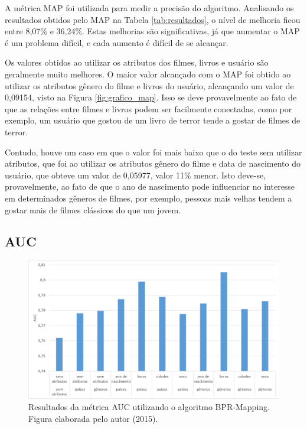 A métrica \ac{MAP} foi utilizada para medir a precisão do algoritmo. Analisando os resultados obtidos pelo \ac{MAP} na Tabela \ref{tab:resultados}, o nível de melhoria ficou entre 8,07\% e 36,24\%. Estas melhorias são significativas, já que aumentar o \ac{MAP} é um problema difícil, e cada aumento é difícil de se alcançar.

Os valores obtidos ao utilizar os atributos dos filmes, livros e usuário são geralmente muito melhores. O maior valor alcançado com o \ac{MAP} foi obtido ao utilizar os atributos gênero do filme e livros do usuário, alcançando um valor de 0,09154, visto na Figura \ref{fig:grafico_map}. Isso se deve provavelmente ao fato de que as relações entre filmes e livros podem ser facilmente conectadas, como por exemplo, um usuário que gostou de um livro de terror tende a gostar de filmes de terror.

Contudo, houve um caso em que o valor foi mais baixo que o do teste sem utilizar atributos, que foi ao utilizar os atributos gênero do filme e data de nascimento do usuário, que obteve um valor de 0,05977, valor 11\% menor. Isto deve-se, provavelmente, ao fato de que o ano de nascimento pode influenciar no interesse em determinados gêneros de filmes, por exemplo, pessoas mais velhas tendem a gostar mais de filmes clássicos do que um jovem.

\subsection{AUC}


\begin{figure}
	\centering
	\includegraphics[scale=0.5]{imagens/grafico_auc.png}
	\caption{Resultados da métrica AUC utilizando o algoritmo BPR-Mapping. Figura elaborada pelo autor (2015).}
	\label{fig:grafico_auc}
\end{figure}

